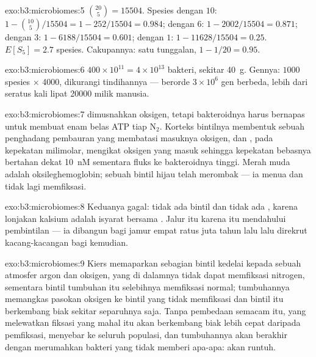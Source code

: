 \begin{solution}{exo:b3:microbiomes:5}
$\binom{20}{5} = \num{15504}$. Spesies dengan $10$: $1 - \binom{10}{5}/
\num{15504} = 1 - 252/\num{15504} = 0.984$; dengan $6$: $1 - 2002/\num{15504}
= 0.871$; dengan $3$: $1 - 6188/\num{15504} = 0.601$; dengan $1$: $1 -
\num{11628}/\num{15504} = 0.25$. $E[S_{5}] = 2.7$ spesies. Cakupannya: satu
tunggalan, $1 - 1/20 = 0.95$.
\end{solution}

\begin{solution}{exo:b3:microbiomes:6}
$400\times 10^{11} = 4\times 10^{13}$ bakteri, sekitar \qty{40}{g}. Gennya:
$1000$ spesies $\times$ \num{4000}, dikurangi tindihannya --- berorde
$3\times 10^{6}$ gen berbeda, lebih dari seratus kali lipat \num{20000}
milik manusia.
\end{solution}

\begin{solution}{exo:b3:microbiomes:7}
 dimusnahkan oksigen, tetapi bakteroidnya harus bernapas
untuk membuat enam belas ATP tiap N$_{2}$. Korteks bintilnya membentuk sebuah
penghadang pembauran yang membatasi masuknya oksigen, dan , pada
kepekatan milimolar, mengikat oksigen yang masuk sehingga kepekatan
bebasnya bertahan dekat \qty{10}{nM} sementara fluks ke bakteroidnya
tinggi. Merah muda adalah oksileghemoglobin; sebuah bintil hijau telah
merombak  --- ia menua dan tidak lagi memfiksasi.
\end{solution}

\begin{solution}{exo:b3:microbiomes:8}
Keduanya gagal: tidak ada bintil dan tidak ada , karena
lonjakan kalsium adalah isyarat bersama .
Jalur itu karena itu mendahului pembintilan --- ia dibangun bagi
 jamur empat ratus juta tahun lalu lalu direkrut
kacang-kacangan bagi  kemudian.
\end{solution}

\begin{solution}{exo:b3:microbiomes:9}
Kiers memaparkan sebagian bintil kedelai kepada sebuah atmosfer argon dan
oksigen, yang di dalamnya  tidak dapat memfiksasi nitrogen, sementara
bintil tumbuhan itu selebihnya memfiksasi normal; tumbuhannya memangkas pasokan
oksigen ke bintil yang tidak memfiksasi dan  bintil itu berkembang biak
sekitar separuhnya saja. Tanpa pembedaan semacam itu,  yang melewatkan
fiksasi yang mahal itu akan berkembang biak lebih cepat daripada pemfiksasi,
menyebar ke seluruh populasi, dan tumbuhannya akan berakhir dengan merumahkan
bakteri yang tidak memberi apa-apa:  akan runtuh.
\end{solution}


